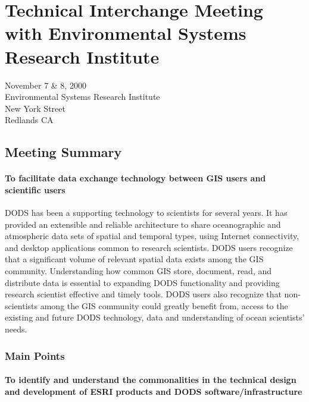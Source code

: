\renewcommand{\chaptertitle}{Technical Interchange Meeting with %
Environmental Systems Research Institute}
\chapter{\chaptertitle}
\label{app,esri}


\begin{center}
November 7 \& 8, 2000\\
Environmental Systems Research Institute\\
New York Street\\
Redlands CA
\end{center}


\section{Meeting Summary}


\subsubsection{To facilitate data exchange technology between GIS users and scientific users} 

DODS has been a supporting technology to scientists for several years. It has provided an 
extensible and reliable architecture to share oceanographic and atmospheric data sets of spatial 
and temporal types, using Internet connectivity, and desktop applications common to research 
scientists. DODS users recognize that a significant volume of relevant spatial data exists among 
the GIS community. Understanding how common GIS store, document, read, and distribute data 
is essential to expanding DODS functionality and providing research scientist effective and 
timely tools. DODS users also recognize that non-scientists among the GIS community could 
greatly benefit from, access to the existing and future DODS technology, data and understanding 
of ocean scientists' needs.


\subsection{Main Points}

 \subsubsection{To identify and understand the commonalities in the technical design and development of 
ESRI products and DODS software/infrastructure}

